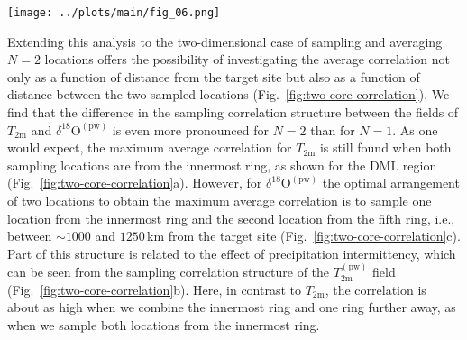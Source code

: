 \documentclass[cp, manuscript]{copernicus}
\begin{document}
\begin{figure*}[t]%
\centering
\texttt{[image: ../plots/main/fig\_06.png]}
\caption{%
  Sampling correlation structure with temperature in the two-dimensional case
  of sampling two locations in the DML region. Shown is the mean correlation of
  all possible single correlations for the average of two grid cells of
  \textbf{(a)} $T_{\mathrm{2m}}$, \textbf{(b)} $T_{\mathrm{2m}}^{\mathrm{(pw)}}$
  and \textbf{(c)} $\delta^{18}\mathrm{O}^{\mathrm{(pw)}}$ time series sampled
  from the same ring or from two different rings, averaged over all target sites
  in the given region. The axes display the distance from the target site, where
  the $x$ ($y$) axis represents the first (second) sampled ring and the tick
  marks indicate the midpoint radii of the rings. Note the marked difference in
  the locations of the correlation maxima between $T_{\mathrm{2m}}$ and
  $\delta^{18}\mathrm{O}^{\mathrm{(pw)}}$.}
\label{fig:two-core-correlation}%
\end{figure*}%

Extending this analysis to the two-dimensional case of sampling and averaging
$N=2$ locations offers the possibility of investigating the average correlation
not only as a function of distance from the target site but also as a function
of distance between the two sampled locations
(Fig.~\ref{fig:two-core-correlation}). We find that the difference in the
sampling correlation structure between the fields of $T_{\mathrm{2m}}$ and
$\delta^{18}\mathrm{O}^{\mathrm{(pw)}}$ is even more pronounced for $N=2$ than
for $N=1$. As one would expect, the maximum average correlation for
$T_{\mathrm{2m}}$ is still found when both sampling locations are from the
innermost ring, as shown for the DML region
(Fig.~\ref{fig:two-core-correlation}a). However, for
$\delta^{18}\mathrm{O}^{\mathrm{(pw)}}$ the optimal arrangement of two locations
to obtain the maximum average correlation is to sample one location from the
innermost ring and the second location from the fifth ring, i.e., between
$\sim1000$ and $1250$\,km from the target site
(Fig.~\ref{fig:two-core-correlation}c). Part of this structure is related to the
effect of precipitation intermittency, which can be seen from the sampling
correlation structure of the $T_{\mathrm{2m}}^{\mathrm{(pw)}}$ field
(Fig.~\ref{fig:two-core-correlation}b). Here, in contrast to $T_{\mathrm{2m}}$,
the correlation is about as high when we combine the innermost ring and one ring
further away, as when we sample both locations from the innermost ring.
\end{document}
